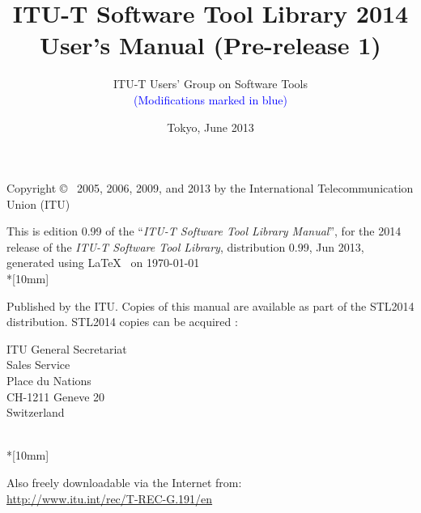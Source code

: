 \documentclass[12pt,a4paper]{book}
\begin{document}
\def\long{{\tt long}}
\SF

\def\sixsf{\footnotesize\tt}
\def\tenrm{\small\tt}
\def\twlsf{\sf}


\title{ITU-T Software Tool Library 2014 User's Manual (Pre-release 1)}
\author{ITU-T Users' Group on Software Tools\\
\textcolor{blue}{(Modifications marked in blue)}}
\date{Tokyo, June 2013}

\maketitle
\thispagestyle{empty}


 Copyright \copyright~ 2005, 2006, 2009, and 2013 by the International
 Telecommunication Union (ITU)


This is edition 0.99 of the ``{\em ITU-T Software Tool Library
  Manual}'', for the 2014 release of the {\em ITU-T Software Tool
  Library}, distribution 0.99, Jun 2013, generated using \LaTeX
~on \today\\*[10mm]

Published by the ITU. Copies of this manual are available as part
of the STL2014 distribution. STL2014 copies can be acquired :

{\centering \begin{minipage}{50mm}
                   ITU General Secretariat\\
                   Sales Service\\
                   Place du Nations\\
                   CH-1211 Geneve 20\\
                   Switzerland
            \end{minipage}\\*[10mm]
}

Also freely downloadable via the Internet from: \\
\url{http://www.itu.int/rec/T-REC-G.191/en}
\end{document}
